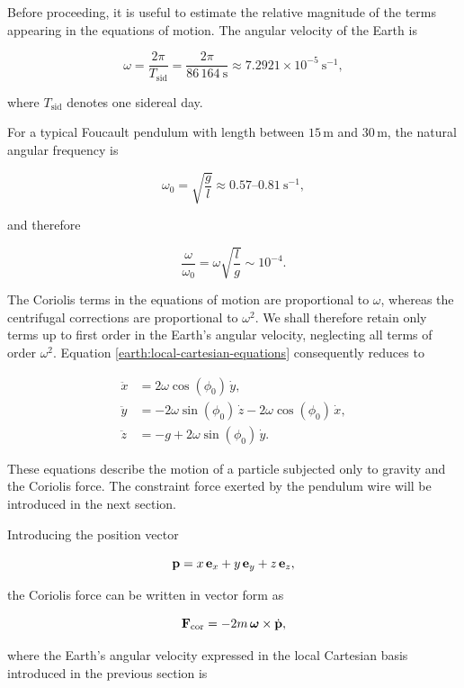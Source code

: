 \documentclass[12pt]{article}
\begin{document}
Before proceeding, it is useful to estimate the relative magnitude of the terms
appearing in the equations of motion. The angular velocity of the Earth is

\[
  \omega
  =
  \frac{2\pi}{T_{\mathrm{sid}}}
  =
  \frac{2\pi}{86\,164\ \mathrm{s}}
  \approx
  7.2921\times10^{-5}\ \mathrm{s}^{-1},
\]

where $T_{\mathrm{sid}}$ denotes one sidereal day.

For a typical Foucault pendulum with length between $15\,\mathrm{m}$ and
$30\,\mathrm{m}$, the natural angular frequency is

\[
  \omega_0
  =
  \sqrt{\frac{g}{l}}
  \approx
  0.57\text{--}0.81\ \mathrm{s}^{-1},
\]

and therefore

\[
  \frac{\omega}{\omega_0}
  =
  \omega\sqrt{\frac{l}{g}}
  \sim
  10^{-4}.
\]

The Coriolis terms in the equations of motion are proportional to $\omega$,
whereas the centrifugal corrections are proportional to $\omega^2$. We shall
therefore retain only terms up to first order in the Earth's angular velocity,
neglecting all terms of order $\omega^2.$ Equation
\eqref{earth:local-cartesian-equations} consequently reduces to

\begin{equation}
  \begin{aligned}
    \ddot{x}
      &=
      2\omega\cos(\phi_0)\,\dot{y},
      \\
    \ddot{y}
      &=
      -2\omega\sin(\phi_0)\,\dot{z}
      -2\omega\cos(\phi_0)\,\dot{x},
      \\
    \ddot{z}
      &=
      -g
      +2\omega\sin(\phi_0)\,\dot{y}.
  \end{aligned}
  \label{earth:first-order-local-equations}
\end{equation}

These equations describe the motion of a particle subjected only to gravity and
the Coriolis force. The constraint force exerted by the pendulum wire will be
introduced in the next section.

Introducing the position vector

\[
  \vb{p}
  =
  x\,\vb{e}_x
  +
  y\,\vb{e}_y
  +
  z\,\vb{e}_z,
\]

the Coriolis force can be written in vector form as

\[
  \vb{F}_{\mathrm{cor}}
  =
  -2m\,
  \boldsymbol{\omega}
  \times
  \dot{\vb{p}},
\]

where the Earth's angular velocity expressed in the local Cartesian basis
introduced in the previous section is
\end{document}
